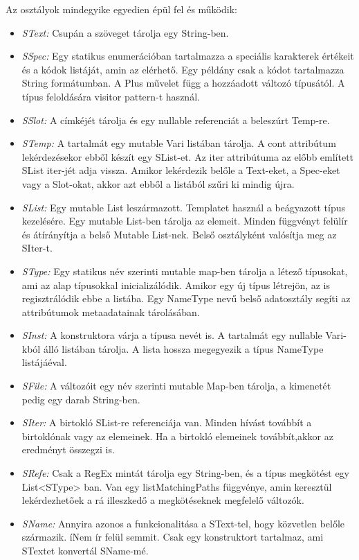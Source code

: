 {Az osztályok mindegyike egyedien épül fel és működik:
\begin{itemize}
\item \emph{SText:} 
Csupán a szöveget tárolja egy String-ben.
\item \emph{SSpec:} 
Egy statikus enumerációban tartalmazza a speciális karakterek értékeit és a kódok listáját, amin az elérhető.
Egy példány csak a kódot tartalmazza String formátumban.
A Plus művelet függ a hozzáadott változó típusától.
A típus feloldására visitor pattern-t használ. 
\item \emph{SSlot:} 
A címkéjét tárolja és egy nullable referenciát a beleszúrt Temp-re. 
\item \emph{STemp:} 
A tartalmát egy mutable Vari listában tárolja.
A cont attribútum lekérdezésekor ebből készít egy SList-et.
Az iter attribútuma az előbb említett SList iter-jét adja vissza. 
Amikor lekérdezik belőle a Text-eket, a Spec-eket vagy a Slot-okat, akkor azt ebből a listából szűri ki mindig újra.
\item \emph{SList:}
Egy mutable List leszármazott.
Templatet használ a beágyazott típus kezelésére.
Egy mutable List-ben tárolja az elemeit.
Minden függvényt felülír és átírányítja a belső Mutable List-nek.
Belső osztályként valósítja meg az SIter-t. 
\item \emph{SType:} 
Egy statikus név szerinti mutable map-ben tárolja a létező típusokat, ami az alap típusokkal inicializálódik.
Amikor egy új típus létrejön, az is regisztrálódik ebbe a listába.
Egy NameType nevű belső adatosztály segíti az attribútumok metaadatainak tárolásában.
\item \emph{SInst:} 
A konstruktora várja a típusa nevét is.
A tartalmát egy nullable Vari-kból álló listában tárolja. 
A lista hossza megegyezik a típus NameType listájáéval.
\item \emph{SFile:}
A változóit egy név szerinti mutable Map-ben tárolja, a kimenetét pedig egy darab String-ben.
\item \emph{SIter:}
A birtokló SList-re referenciája van.
Minden hívást továbbít a birtoklónak vagy az elemeinek.
Ha a birtokló elemeinek továbbít,akkor az eredményt összegzi is. 
\item \emph{SRefe:}
Csak a RegEx mintát tárolja egy String-ben, és a típus megkötést egy List<SType> ban.
Van egy listMatchingPaths függvénye, amin keresztül lekérdezhetőek a rá illeszkedő a megkötéseknek megfelelő változók.
\item \emph{SName:} 
Annyira azonos a funkcionalitása a SText-tel, hogy közvetlen belőle származik.
íNem ír felül semmit.
Csak egy konstruktort tartalmaz, ami STextet konvertál SName-mé.
\end{itemize}

}
